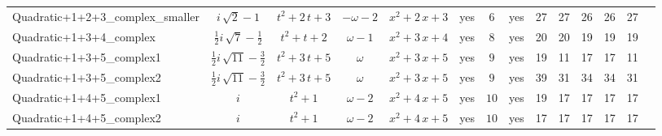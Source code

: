 \begin{tabular}{l|c c c c|ccc|c c  c  c  c  c }
Quadratic+1+2+3\_complex\_smaller & $ i \, \sqrt{2} - 1 $ & $ t^{2} + 2 \, t + 3 $ & $ -\omega - 2 $ & $ x^{2} + 2 \, x + 3 $ & yes & $ 6 $ & yes & 27 & 27 & 26 & 26 & 27 \\
Quadratic+1+3+4\_complex & $ \frac{1}{2} i \, \sqrt{7} - \frac{1}{2} $ & $ t^{2} + t + 2 $ & $ \omega - 1 $ & $ x^{2} + 3 \, x + 4 $ & yes & $ 8 $ & yes & 20 & 20 & 19 & 19 & 19 \\
Quadratic+1+3+5\_complex1 & $ \frac{1}{2} i \, \sqrt{11} - \frac{3}{2} $ & $ t^{2} + 3 \, t + 5 $ & $ \omega $ & $ x^{2} + 3 \, x + 5 $ & yes & $ 9 $ & yes & 19 & 11 & 17 & 17 & 11 \\
Quadratic+1+3+5\_complex2  & $ \frac{1}{2} i \, \sqrt{11} - \frac{3}{2} $ & $ t^{2} + 3 \, t + 5 $ & $ \omega $ & $ x^{2} + 3 \, x + 5 $ & yes & $ 9 $ & yes & 39 & 31 & 34 & 34 & 31 \\
Quadratic+1+4+5\_complex1 & $ i $ & $ t^{2} + 1 $ & $ \omega - 2 $ & $ x^{2} + 4 \, x + 5 $ & yes & $ 10 $ & yes & 19 & 17 & 17 & 17 & 17 \\
Quadratic+1+4+5\_complex2 & $ i $ & $ t^{2} + 1 $ & $ \omega - 2 $ & $ x^{2} + 4 \, x + 5 $ & yes & $ 10 $ & yes & 17 & 17 & 17 & 17 & 17 \\
\end{tabular}
